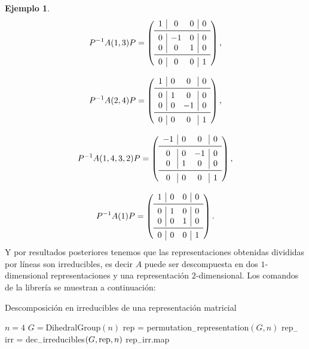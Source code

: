 \documentclass[12pt]{book}
\theoremstyle{definition}
\newtheorem{example}[theorem]{Ejemplo}
\newcounter{in}
\begin{document}
\begin{example}
\[
P^{-1}A(1, 3)P =
\left( \begin{array}{c|cc|c}
1 &  0 & 0 & 0 \\
\midrule
0 & -1 & 0 & 0 \\
0 &  0 & 1 & 0 \\
\midrule
0 &  0 & 0 & 1 \\
\end{array}\right),
\]

\[
P^{-1}A(2, 4)P =
\left( \begin{array}{c|cc|c}
1 & 0 &  0 & 0 \\
\midrule
0 & 1 &  0 & 0 \\
0 & 0 & -1 & 0 \\
\midrule
0 & 0 &  0 & 1 \\
\end{array}\right),
\]

\[
P^{-1}A(1, 4, 3, 2)P =
\left( \begin{array}{c|cc|c}
-1 & 0 &  0 & 0 \\
\midrule
 0 & 0 & -1 & 0 \\
 0 & 1 &  0 & 0 \\
\midrule
 0 & 0 &  0 & 1 \\
\end{array}\right),
\]

\[
P^{-1}A(1)P =
\left( \begin{array}{c|cc|c}
1 & 0 & 0 & 0 \\
\midrule
0 & 1 & 0 & 0 \\
0 & 0 & 1 & 0 \\
\midrule
0 & 0 & 0 & 1 \\
\end{array}\right).
\]
Y por resultados posteriores tenemos que las representaciones obtenidas divididas por líneas son irreducibles, es decir $A$ puede ser descompuesta en dos $1$-dimensional representaciones y una representación $2$-dimensional. Los comandos de la librería se muestran a continuación:
\begin{algorithm}[H]
\caption{Descomposición en irreducibles de una representación matricial}
\begin{algorithmic}
\REQUIRE $n = 4$
\REQUIRE $G = $DihedralGroup$(n)$
\STATE rep = permutation$_{-}$representation$(G, n)$
\STATE rep$_{-}$irr = dec$_{-}$irreducibles$(G, \textup{rep}, n)$
\PRINT rep$_{-}$irr.map
\end{algorithmic}
\end{algorithm}
\end{example}
\end{document}
